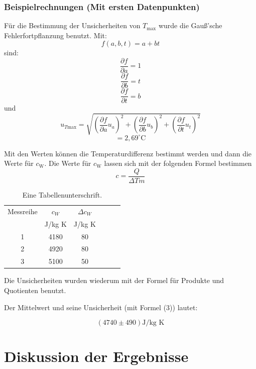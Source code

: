 \documentclass[11pt,a4paper]{article} %
\begin{document}
\begin{tcolorbox}[colback=white]
\subsubsection{Beispielrechnungen (Mit ersten Datenpunkten)}
Für die Bestimmung der Unsicherheiten von $T_\textrm{max}$ wurde die Gauß'sche Fehlerfortpflanzung benutzt. Mit:
$$ f(a,b,t) = a + bt$$
sind:
$$\frac{\partial f }{\partial a} =  1$$
$$\frac{\partial f}{\partial b} = t$$
$$\frac{\partial f}{\partial t} = b$$
und 
$$u_{T\textrm{max}} = \sqrt{ 
	(\frac{\partial f }{\partial a} u_a)^2 +
	(\frac{\partial f}{\partial b} u_b)^2+
	(\frac{\partial f}{\partial t} u_t)^2}$$
$$  = 2,69 ^\circ \text{C}$$

\end{tcolorbox}


Mit den Werten können die Temperaturdifferenz bestimmt werden und dann die Werte für $c_\textrm{W}$. Die Werte für $c_\textrm{W}$ lassen sich mit der folgenden Formel bestimmen
$$ c = \frac{Q}{\Delta T m}$$


\begin{table}[h]
	\centering
	\begin{tabular*}{0.99\textwidth}{@{\extracolsep{\fill}}cccccc}
		\toprule
		Messreihe & $c_W$ & $\Delta c_W$  \\
		& J/kg K & J/kg K \\
		1 & 4180 & 80  \\
		2 & 4920 & 80 \\
		3 & 5100 & 50 \\
		\bottomrule
	\end{tabular*}
	\caption{Eine Tabellenunterschrift.}
	\label{tabelle4}
\end{table}

Die Unsicherheiten wurden wiederum mit der Formel für Produkte und Quotienten benutzt. 

Der Mittelwert und seine Unsicherheit (mit Formel (3)) lautet:

$$ (4740 \pm 490) \textrm{J/kg K} $$

\section{Diskussion der Ergebnisse}
\end{document}
